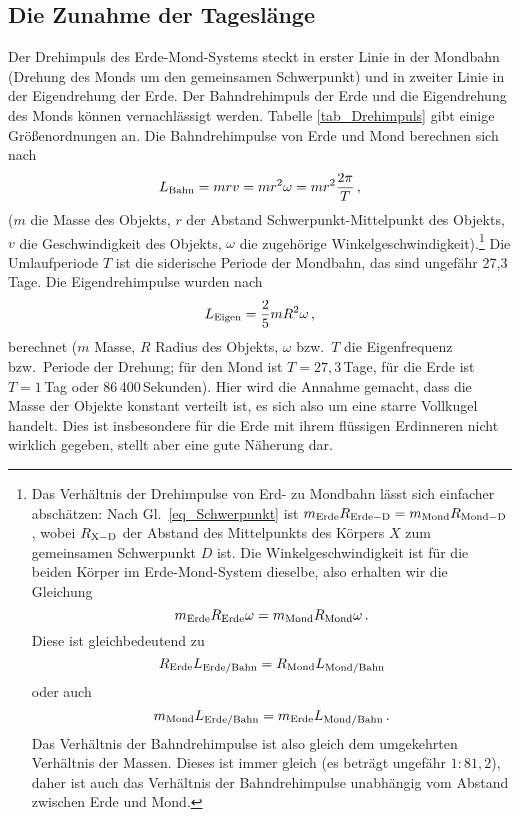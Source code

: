 \subsection{Die Zunahme der Tagesl\"ange}

Der Drehimpuls des Erde-Mond-Systems steckt in erster Linie in der
Mondbahn (Drehung des Monds um den gemeinsamen Schwerpunkt) und
in zweiter Linie in der Eigendrehung der Erde. Der Bahndrehimpuls der Erde und die
Eigendrehung des Monds k\"onnen vernachl\"assigt werden. Tabelle \ref{tab_Drehimpuls} gibt
einige Gr\"o\ss enordnungen an. Die Bahndrehimpulse von Erde und Mond berechnen
sich nach
\begin{equation}
\label{eq_Bahndrehimpuls}
             L_{\rm Bahn} = m r v = m r^2 \omega = m r^2 \frac{2\pi}{T} \, ,
\end{equation}
($m$ die Masse des Objekts, $r$ der Abstand Schwerpunkt-Mittelpunkt des Objekts, $v$ die 
Geschwindigkeit des Objekts, $\omega$ die zugeh\"orige Winkelgeschwindigkeit).\footnote{
Das Verh\"altnis der Drehimpulse von Erd- zu Mondbahn l\"asst sich einfacher absch\"atzen:
Nach Gl.\ \ref{eq_Schwerpunkt} ist $m_{\rm Erde} R_{\rm Erde-D}=m_{\rm Mond} R_{\rm Mond-D}$,
wobei $R_{\rm X-D}$ der Abstand des Mittelpunkts des K\"orpers $X$ zum gemeinsamen Schwerpunkt
$D$ ist. Die Winkelgeschwindigkeit ist f\"ur die beiden K\"orper im Erde-Mond-System dieselbe, also
erhalten wir die Gleichung
\[   m_{\rm Erde} R_{\rm Erde} \omega = m_{\rm Mond} R_{\rm Mond}  \omega \, .\]
Diese ist gleichbedeutend zu
\[   R_{\rm Erde} L_{\rm Erde/Bahn} =  R_{\rm Mond} L_{\rm Mond/Bahn} \]
oder auch
\[   m_{\rm Mond} L_{\rm Erde/Bahn} =  m_{\rm Erde} L_{\rm Mond/Bahn}  \, .\]
Das Verh\"altnis der Bahndrehimpulse ist also gleich dem umgekehrten Verh\"altnis der Massen.
Dieses ist immer gleich (es betr\"agt ungef\"ahr $1:81,2$), daher ist auch das Verh\"altnis der Bahndrehimpulse 
unabh\"angig vom Abstand zwischen Erde und Mond. } 
Die Umlaufperiode $T$ ist die siderische Periode der Mondbahn, das sind ungef\"ahr 27,3 Tage.
Die Eigendrehimpulse wurden nach
\begin{equation}
\label{eq_Eigendrehimpuls}
             L_{\rm Eigen} = \frac{2}{5}  m R^2 \omega \, ,
\end{equation}
berechnet ($m$ Masse, $R$ Radius des Objekts, $\omega$ bzw.\ $T$ die Eigenfrequenz
bzw.\ Periode der Drehung; f\"ur den Mond ist $T=27,3$\,Tage, f\"ur die Erde ist $T=1$\,Tag oder
86\,400\,Sekunden). Hier wird die Annahme gemacht, dass die Masse der Objekte konstant 
verteilt ist, es sich also um eine starre Vollkugel handelt. Dies ist insbesondere f\"ur die Erde
mit ihrem fl\"ussigen Erdinneren nicht wirklich gegeben, stellt aber eine gute N\"aherung dar. 

